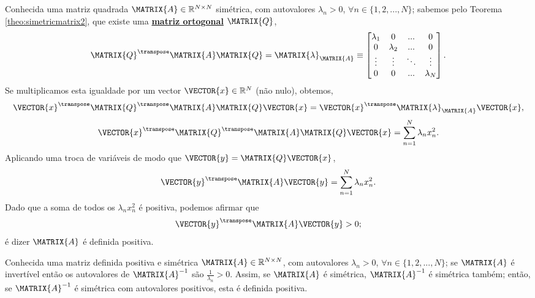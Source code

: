 \begin{myproofT}\label{proof:theo:positivematrix2}
Conhecida uma matriz quadrada $\MATRIX{A} \in \mathbb{R}^{N \times N}$ simétrica,
com  autovalores $\lambda_n>0$, $\forall n \in \{1, 2, ..., N\}$;
sabemos pelo Teorema \ref{theo:simetricmatrix2}, 
que existe uma \hyperref[def:ortogonalmatrix0]{\textbf{matriz ortogonal}} $\MATRIX{Q}$,
\begin{equation}
\MATRIX{Q}^{\transpose}\MATRIX{A}\MATRIX{Q} = \MATRIX{\lambda}_{\MATRIX{A}}\equiv
\begin{bmatrix}
\lambda_1 & 0         & ...    & 0 \\
0         & \lambda_2 & ...    & 0 \\
\vdots    & \vdots    & \ddots & \vdots \\
0         & 0         & ...    & \lambda_N
\end{bmatrix}.
\end{equation}
Se multiplicamos esta igualdade por um vector $\VECTOR{x} \in \mathbb{R}^N$ (não nulo), obtemos,
\begin{equation}
\VECTOR{x}^{\transpose} \MATRIX{Q}^{\transpose}\MATRIX{A}\MATRIX{Q} \VECTOR{x} = 
\VECTOR{x}^{\transpose} \MATRIX{\lambda}_{\MATRIX{A}} \VECTOR{x},
\end{equation}
\begin{equation}
\VECTOR{x}^{\transpose} \MATRIX{Q}^{\transpose}\MATRIX{A}\MATRIX{Q} \VECTOR{x} 
= \sum \limits_{n=1}^{N}\lambda_n x_n^2.
\end{equation}
Aplicando uma troca de variáveis de modo que $\VECTOR{y}=\MATRIX{Q} \VECTOR{x}$,
\begin{equation}
\VECTOR{y}^{\transpose} \MATRIX{A} \VECTOR{y} 
= \sum \limits_{n=1}^{N}\lambda_n x_n^2.
\end{equation}
Dado que a soma de todos os $\lambda_n x_n^2$ é positiva, podemos afirmar que
\begin{equation}
\VECTOR{y}^{\transpose} \MATRIX{A} \VECTOR{y} > 0;
\end{equation}
é dizer $\MATRIX{A}$ é definida positiva.
\end{myproofT}

\begin{myproofT}\label{proof:theo:positivematrix:2}
Conhecida uma matriz definida positiva e simétrica $\MATRIX{A} \in \mathbb{R}^{N \times N}$,
com  autovalores $\lambda_n>0$, $\forall n \in \{1, 2, ..., N\}$;
se $\MATRIX{A}$  é invertível então os autovalores de $\MATRIX{A}^{-1}$ são  $\frac{1}{\lambda_n}>0$.
Assim, se $\MATRIX{A}$ é simétrica, $\MATRIX{A}^{-1}$ é simétrica também;
então, se $\MATRIX{A}^{-1}$ é simétrica com autovalores positivos, esta é definida positiva.
\end{myproofT}

